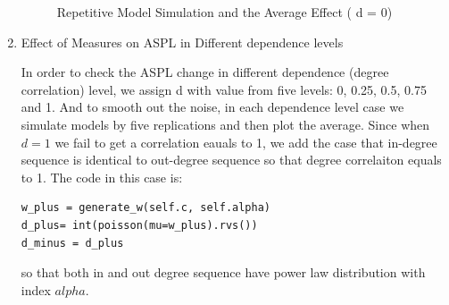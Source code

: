 \documentclass{article}
\begin{document}
\begin{enumerate}
\begin{figure}[!hbtp]
\hfill
{}
\hfill
{}
\hfill
\caption{
\label{repetitions}%
 Repetitive Model Simulation and the Average Effect ( d = 0)}
\end{figure}

\item Effect of Measures on ASPL in Different dependence levels\\

\par In order to check the ASPL change in different dependence (degree correlation) level, we assign d with value from five levels: 0, 0.25, 0.5, 0.75 and 1. And to smooth out the noise, in each dependence level case we simulate models by five replications and then plot the average. Since when $d = 1$ we fail to get a correlation eauals to 1, we add the case that in-degree sequence is identical to out-degree sequence so that degree correlaiton equals to 1. The code in this case is:

\begin{lstlisting}
w_plus = generate_w(self.c, self.alpha)
d_plus= int(poisson(mu=w_plus).rvs())
d_minus = d_plus
\end{lstlisting}
so that both in and out degree sequence have power law distribution with index $alpha$.


\end{enumerate}
\end{document}
